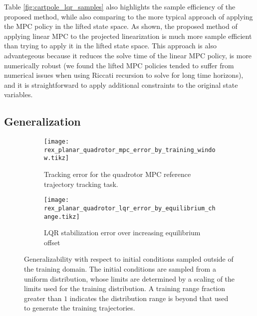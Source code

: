 \documentclass{article}
\begin{document}
Table \ref{fig:cartpole_lqr_samples} also highlights the sample efficiency of the proposed 
method, while also comparing to the more typical approach of applying the MPC policy in the 
lifted state space. As shown, the proposed method of applying linear MPC to the projected 
linearization is much more sample efficient than trying to apply it in the lifted state 
space. This approach is also advantegeous because it reduces the solve time of the linear 
MPC policy, is more numerically robust (we found the lifted MPC policies tended to suffer 
from numerical issues when using Riccati recursion to solve for long time horizons), and 
it is straightforward to apply additional constraints to the original state variables.

\subsection{Generalization}
\begin{figure}[t] \centering
  \begin{subfigure}[t]{0.48\textwidth}
    \raggedright
    \texttt{[image: rex\_planar\_quadrotor\_mpc\_error\_by\_training\_window.tikz]}
    \caption{Tracking error for the quadrotor MPC reference trajectory tracking task.}
    \label{fig:rex_planar_quadrotor_mpc_error_by_training_window}
  \end{subfigure}
  \hfill
  \begin{subfigure}[t]{0.49\textwidth}
    \centering
    \texttt{[image: rex\_planar\_quadrotor\_lqr\_error\_by\_equilibrium\_change.tikz]}
    \caption{LQR stabilization error over increasing equilibrium offset}
    \label{fig:rex_planar_quadrotor_lqr_error_by_equilibrium_change}
  \end{subfigure}
  \caption{Generalizability with respect to initial conditions sampled outside of the 
  training domain. The initial conditions are sampled from a uniform distribution, whose 
  limits are determined by a scaling of the limits used for the training distribution. 
  A training range fraction greater than $1$ indicates the
  distribution range is beyond that used to generate the training trajectories.
  }
  \label{fig:training_window}
\end{figure}
\end{document}
